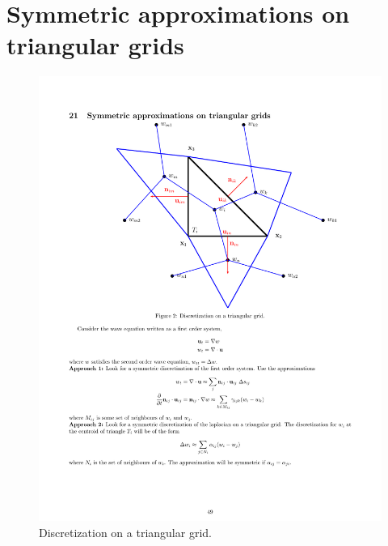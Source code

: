 \documentclass[10pt]{article}
\begin{document}
\clearpage


\clearpage
\section{Symmetric approximations on triangular grids}

{
\newcommand{\figWidtha}{16cm}
\begin{figure}
\begin{center}
\includegraphics[width=\figWidtha]{figures/triangularGridDiscreteApproximation}
\end{center}
\caption{Discretization on a triangular grid.} \label{fig:tri}
\end{figure}
}
\end{document}
